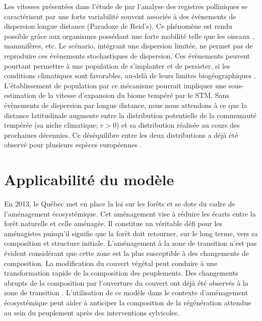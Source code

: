 Les vitesses présentées dans l'étude de \citet{Davis1981} par l'analyse des registres polliniques se
caractérisent par une forte variabilité souvent associée à des évènements de dispersion longue
distance (Paradoxe de Reid's). Ce phénomène est rendu possible grâce aux organismes possédant une
forte mobilité telle que les oiseaux \citep{Clark1998}, mammifères, etc. Le scénario, intégrant une
dispersion limitée, ne permet pas de reproduire ces évènements stochastiques de dispersion. Ces
évènements peuvent pourtant permettre à une population de s'implanter et de persister, si les
conditions climatiques sont favorables, au-delà de leurs limites biogéographiques
\citep{Clark1998,Corlett2013}. L'établissement de population par ce mécanisme pourrait impliquer une
sous-estimation de la vitesse d'expansion du biome tempéré par le STM.  Sans évènements de dispersion
par longue distance, nous nous attendons à ce que la distance latitudinale augmente entre la
distribution potentielle de la communauté tempérée (sa niche climatique; $r>0$) et sa distribution
réalisée au cours des prochaines décennies. Ce déséquilibre entre les deux distributions a déjà été
observé pour plusieurs espèces européennes \citep{Svenning2004}.

\section*{Applicabilité du modèle}

En 2013, le Québec met en place la loi sur les forêts et se dote du cadre de l'aménagement
écosystémique. Cet aménagement vise à réduire les écarts entre la forêt naturelle et celle aménagée.
Il constitue un véritable défi pour les aménagistes puisqu'il signifie que la forêt doit retourner,
sur le long terme, vers sa composition et structure initiale. L'aménagement à la zone de transition
n'est pas évident considérant que cette zone est la plus susceptible à des changements de
composition.  La modification du couvert végétal peut conduire à une transformation rapide de la
composition des peuplements. Des changements abrupts de la composition par l'ouverture du couvert
ont déjà été observés à la zone de transition \cite{Dupuis2011,Boucher2006}. L'utilisation de ce
modèle dans le contexte d'aménagement écosystémique peut aider à anticiper la composition de la
régénération attendue au sein du peuplement après des interventions sylvicoles.
